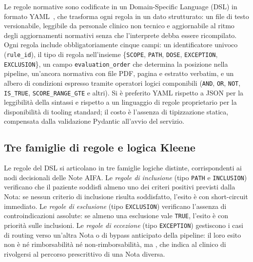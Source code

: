 Le regole normative sono codificate in un Domain-Specific Language (DSL)
in formato YAML~\cite{yamlspec}, che trasforma ogni regola in un dato
strutturato: un file di testo versionabile, leggibile da personale clinico
non tecnico e aggiornabile al ritmo degli aggiornamenti normativi senza
che l'interprete debba essere ricompilato.
Ogni regola include obbligatoriamente cinque campi: un identificatore univoco
(\texttt{rule\_id}), il tipo di regola nell'insieme
\{\texttt{SCOPE}, \texttt{PATH}, \texttt{DOSE}, \texttt{EXCEPTION},
\texttt{EXCLUSION}\}, un campo \texttt{evaluation\_order} che determina
la posizione nella pipeline, un'ancora normativa con file PDF, pagina
e estratto verbatim, e un albero di condizioni espresso tramite operatori
logici componibili (\texttt{AND}, \texttt{OR}, \texttt{NOT}, \texttt{IS\_TRUE},
\texttt{SCORE\_RANGE\_GTE} e altri).
Si è preferito YAML rispetto a JSON per la leggibilità della sintassi e
rispetto a un linguaggio di regole proprietario per la disponibilità di
tooling standard; il costo è l'assenza di tipizzazione statica,
compensata dalla validazione Pydantic all'avvio del servizio.

\subsection{Tre famiglie di regole e logica Kleene}
\label{subsec:famiglie-regole}

Le regole del DSL si articolano in tre famiglie logiche distinte, corrispondenti
ai nodi decisionali delle Note AIFA.
Le \emph{regole di inclusione} (tipo \texttt{PATH} e \texttt{INCLUSION})
verificano che il paziente soddisfi almeno uno dei criteri positivi previsti
dalla Nota: se nessun criterio di inclusione risulta soddisfatto,
l'esito è  con short-circuit immediato.
Le \emph{regole di esclusione} (tipo \texttt{EXCLUSION}) verificano
l'assenza di controindicazioni assolute: se almeno una esclusione vale
\texttt{TRUE}, l'esito è  con priorità
sulle inclusioni.
Le \emph{regole di eccezione} (tipo \texttt{EXCEPTION}) gestiscono
i casi di routing verso un'altra Nota o di bypass anticipato della pipeline:
il loro esito non è né rimborsabilità né non-rimborsabilità, ma
, che indica al clinico di rivolgersi al percorso
prescrittivo di una Nota diversa.

